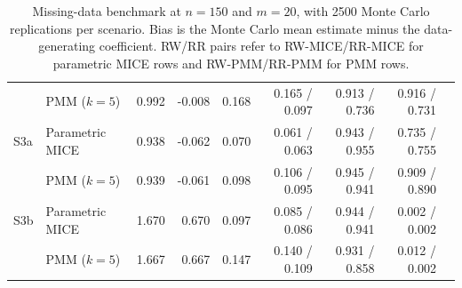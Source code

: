 \begin{table}[ht]
\begin{tabular}{llrrrrrrr}
\addlinespace[1pt]
    & PMM (\(k=5\)) & 0.992 & -0.008 & 0.168 & 0.165 / 0.097 & 0.913 / 0.736 & 0.916 / 0.731 &\\
\addlinespace[1pt]
S3a & Parametric MICE & 0.938 & -0.062 & 0.070 & 0.061 / 0.063 & 0.943 / 0.955 & 0.735 / 0.755 &\\
\addlinespace[1pt]
    & PMM (\(k=5\)) & 0.939 & -0.061 & 0.098 & 0.106 / 0.095 & 0.945 / 0.941 & 0.909 / 0.890 &\\
\addlinespace[1pt]
S3b & Parametric MICE & 1.670 & 0.670  & 0.097 & 0.085 / 0.086 & 0.944 / 0.941 & 0.002 / 0.002 &\\
\addlinespace[1pt]
    & PMM (\(k=5\)) & 1.667 & 0.667 & 0.147 & 0.140 / 0.109 & 0.931 / 0.858 & 0.012 / 0.002 &\\
\bottomrule
\end{tabular}
\caption{Missing-data benchmark at \(n=150\) and \(m=20\), with 2500
Monte Carlo replications per scenario.  Bias is the Monte Carlo mean
estimate minus the data-generating coefficient.  RW/RR pairs
refer to RW-MICE/RR-MICE for parametric MICE rows and
RW-PMM/RR-PMM for PMM rows.}
\label{tab:rw-benchmark-n150}
\end{table}

